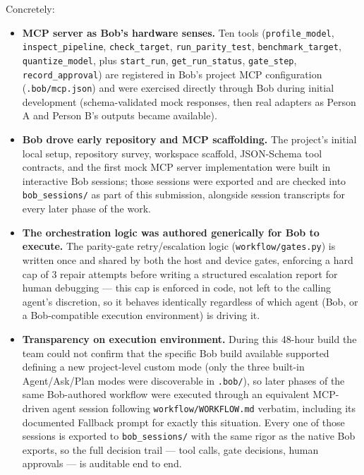 \documentclass[11pt,a4paper]{article}
\begin{document}
Concretely:
\begin{itemize}[leftmargin=1.4em]
  \item \textbf{MCP server as Bob's hardware senses.} Ten tools
  (\texttt{profile\_model}, \texttt{inspect\_pipeline}, \texttt{check\_target},
  \texttt{run\_parity\_test}, \texttt{benchmark\_target},
  \texttt{quantize\_model}, plus \texttt{start\_run}, \texttt{get\_run\_status},
  \texttt{gate\_step}, \texttt{record\_approval}) are registered in Bob's
  project MCP configuration (\texttt{.bob/mcp.json}) and were exercised
  directly through Bob during initial development (schema-validated mock
  responses, then real adapters as Person A and Person B's outputs became
  available).
  \item \textbf{Bob drove early repository and MCP scaffolding.} The
  project's initial local setup, repository survey, workspace scaffold,
  JSON-Schema tool contracts, and the first mock MCP server implementation
  were built in interactive Bob sessions; those sessions were exported and
  are checked into \texttt{bob\_sessions/} as part of this submission,
  alongside session transcripts for every later phase of the work.
  \item \textbf{The orchestration logic was authored generically for Bob to
  execute.} The parity-gate retry/escalation logic
  (\texttt{workflow/gates.py}) is written once and shared by both the host
  and device gates, enforcing a hard cap of 3 repair attempts before
  writing a structured escalation report for human debugging --- this cap
  is enforced in code, not left to the calling agent's discretion, so it
  behaves identically regardless of which agent (Bob, or a Bob-compatible
  execution environment) is driving it.
  \item \textbf{Transparency on execution environment.} During this 48-hour
  build the team could not confirm that the specific Bob build available
  supported defining a new project-level custom mode (only the three
  built-in Agent/Ask/Plan modes were discoverable in \texttt{.bob/}), so
  later phases of the same Bob-authored workflow were executed through an
  equivalent MCP-driven agent session following \texttt{workflow/WORKFLOW.md}
  verbatim, including its documented Fallback prompt for exactly this
  situation. Every one of those sessions is exported to
  \texttt{bob\_sessions/} with the same rigor as the native Bob exports, so
  the full decision trail --- tool calls, gate decisions, human
  approvals --- is auditable end to end.
\end{itemize}
\end{document}
